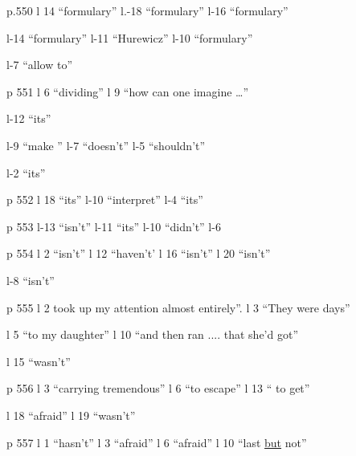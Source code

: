 
p.550 l 14 ``formulary'' \quad l.-18 ``formulary'' \quad l-16 ``formulary''

l-14 ``formulary'' \quad l-11 ``Hurewicz'' \quad l-10 ``formulary''

l-7 ``allow  to''

p 551 l 6 ``dividing'' \quad l 9 ``how can one imagine \ldots''

l-12 ``its''

l-9 ``make '' \quad l-7 ``doesn't'' \quad l-5 ``shouldn't''

l-2 ``its''

p 552 l 18 ``its'' \quad l-10 ``interpret'' \quad l-4 ``its''

p 553 l-13 ``isn't'' \quad l-11 ``its'' \quad l-10 ``didn't'' \quad l-6

p 554 l 2 ``isn't'' \quad l 12 ``haven't' \quad l 16 ``isn't'' \quad l 20 ``isn't''

l-8 ``isn't''

p 555 l 2 took up my attention almost entirely''. \quad l 3 ``They were days''

l 5 ``to my daughter'' \quad l 10 ``and then ran .... that she'd got''

l 15 ``wasn't''

p 556 l 3 ``carrying tremendous'' \quad l 6 ``to escape'' \quad l 13 `` to get''

l 18 ``afraid'' \quad l 19 ``wasn't''

p 557 l 1 ``hasn't'' \quad l 3 ``afraid'' \quad l 6 ``afraid'' \quad l 10 ``last \uline{but} not''

